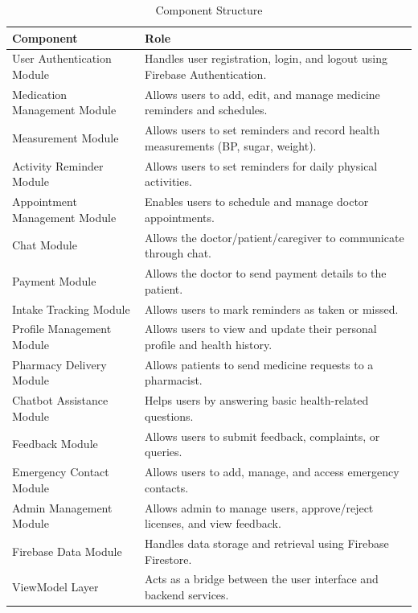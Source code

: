 \begin{table}[H]
\centering
\caption{Component Structure}
\label{tab:components}
\begin{tabularx}{\textwidth}{|l|X|}
\hline
\textbf{Component} & \textbf{Role} \\ \hline
User Authentication Module & Handles user registration, login, and logout using Firebase Authentication. \\ \hline
Medication Management Module & Allows users to add, edit, and manage medicine reminders and schedules. \\ \hline
Measurement Module & Allows users to set reminders and record health measurements (BP, sugar, weight). \\ \hline
Activity Reminder Module & Allows users to set reminders for daily physical activities. \\ \hline
Appointment Management Module & Enables users to schedule and manage doctor appointments. \\ \hline
Chat Module & Allows the doctor/patient/caregiver to communicate through chat. \\ \hline
Payment Module & Allows the doctor to send payment details to the patient. \\ \hline
Intake Tracking Module & Allows users to mark reminders as taken or missed. \\ \hline
Profile Management Module & Allows users to view and update their personal profile and health history. \\ \hline
Pharmacy Delivery Module & Allows patients to send medicine requests to a pharmacist. \\ \hline
Chatbot Assistance Module & Helps users by answering basic health-related questions. \\ \hline
Feedback Module & Allows users to submit feedback, complaints, or queries. \\ \hline
Emergency Contact Module & Allows users to add, manage, and access emergency contacts. \\ \hline
Admin Management Module & Allows admin to manage users, approve/reject licenses, and view feedback. \\ \hline
Firebase Data Module & Handles data storage and retrieval using Firebase Firestore. \\ \hline
ViewModel Layer & Acts as a bridge between the user interface and backend services. \\ \hline
\end{tabularx}
\end{table}

